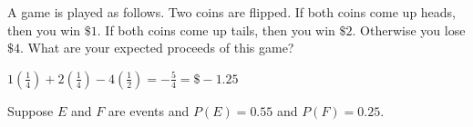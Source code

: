 \documentclass[answers,addpoints,12pt]{exam}
\begin{document}
\begin{questions}
\question[10] A game is played as follows.
Two coins are flipped. If both coins come up
heads, then you win $\$1$. If both coins come
up tails, then you win $\$2$. 
Otherwise you lose $\$4$. What are your expected proceeds
of this game?
\begin{solution}
$1\left(\frac{1}{4}\right)+2\left(\frac{1}{4}\right)
-4\left(\frac{1}{2}\right)=-\frac{5}{4}=\$-1.25$
\end{solution}

\question[15] Suppose $E$ and $F$ are events
and $P\left(E\right)=0.55$ and $P\left(F\right)=0.25$.
\begin{solution}
\end{solution}

\end{questions}

\vfill
\begin{center}\gradetable[h][questions]\end{center}
\end{document}

